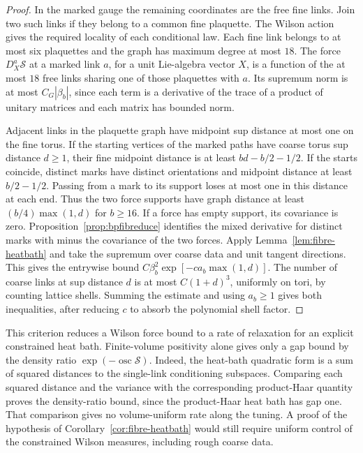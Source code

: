 \begin{proof}
In the marked gauge the remaining coordinates are the free fine links.
Join two such links if they belong to a common fine plaquette. The Wilson
action gives the required locality of each conditional law. Each fine link
belongs to at most six plaquettes and the graph has maximum degree at
most $18$. The force $D_X^a\mathcal S$ at a marked link $a$, for a unit
Lie-algebra vector $X$, is a function of the at most $18$ free links
sharing one of those plaquettes with $a$. Its supremum norm is at most
$C_G|\beta_b|$, since each term is a derivative of the trace of a
product of unitary matrices and each matrix has bounded norm.

Adjacent links in the plaquette graph have midpoint sup distance at most
one on the fine torus. If the starting vertices of the marked paths
have coarse torus sup distance $d\ge1$, their fine midpoint distance
is at least $bd-b/2-1/2$. If the starts coincide, distinct marks have
distinct orientations and midpoint distance at least $b/2-1/2$.
Passing from a mark to its support loses at most one in this distance
at each end. Thus the two force supports have graph distance at least
$(b/4)\max(1,d)$ for $b\ge16$. If a force has empty support, its covariance
is zero. Proposition~\ref{prop:bpfibreduce} identifies the mixed
derivative for distinct marks with minus the covariance of the two
forces. Apply Lemma~\ref{lem:fibre-heatbath} and take the supremum over
coarse data and unit tangent directions. This gives the entrywise bound
$C\beta_b^2\exp[-c a_b\max(1,d)]$.
The number of coarse links at sup distance $d$ is at most $C(1+d)^3$,
uniformly on tori, by counting lattice shells. Summing the estimate and
using $a_b\ge1$ gives both inequalities, after reducing $c$ to absorb the
polynomial shell factor.
\end{proof}

This criterion reduces a Wilson force bound to a rate of relaxation for
an explicit constrained heat bath. Finite-volume positivity alone gives
only a gap bound by the density ratio $\exp(-\operatorname{osc}\mathcal S)$.
Indeed, the heat-bath quadratic form is a sum of squared distances to
the single-link conditioning subspaces. Comparing each squared distance
and the variance with the corresponding product-Haar quantity proves
the density-ratio bound, since the product-Haar heat bath has gap one.
That comparison gives no volume-uniform rate along the tuning. A proof
of the hypothesis of Corollary~\ref{cor:fibre-heatbath} would still
require uniform control of the constrained Wilson measures, including
rough coarse data.
